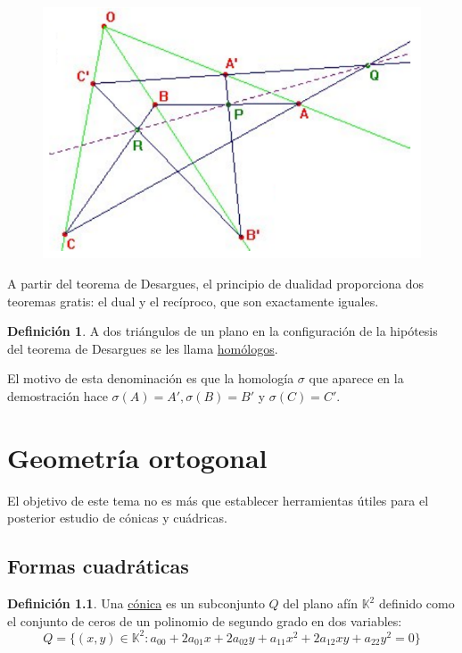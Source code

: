 \documentclass[12pt]{report}
\theoremstyle{definition}
\newtheorem{definition}{Definición}[chapter]
\theoremstyle{definition}
\theoremstyle{remark}
\begin{document}
\begin{figure}[h]
\includegraphics[scale = 0.4]{3.3_1}
\centering
\end{figure}

A partir del teorema de Desargues, el principio de dualidad proporciona dos teoremas gratis: el dual y el recíproco, que son exactamente iguales.

\begin{definition}
A dos triángulos de un plano en la configuración de la hipótesis del teorema de Desargues se les llama \ul{homólogos}.
\end{definition}

El motivo de esta denominación es que la homología $\sigma$ que aparece en la demostración hace $\sigma(A) = A', \sigma(B) = B'$ y $ \sigma(C)=C'$.

\chapter{Geometría ortogonal}

El objetivo de este tema no es más que establecer herramientas útiles para el posterior estudio de cónicas y cuádricas.

\section{Formas cuadráticas}

\begin{definition}
\label{def4.1.}
Una \ul{cónica} es un subconjunto $Q$ del plano afín $\mathbb{K}^2$ definido como el conjunto de ceros de un polinomio de segundo grado en dos variables:
\[Q = \{(x,y) \in \mathbb{K}^2 \colon a_{00}+2a_{01}x+2a_{02}y+a_{11}x^2+2a_{12}xy+a_{22}y^2=0\}\]
\end{definition}
\end{document}
